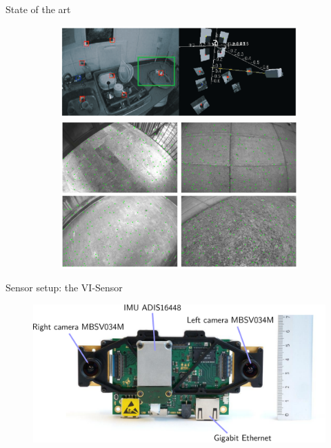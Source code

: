 \documentclass[11pt]{beamer}
\begin{document}
\begin{frame}{State of the art}
\begin{figure}[!htb]
\begin{subfigure}[b]{\textwidth}
\includegraphics[scale=0.1]{figures/introduction/monoslam.pdf}
\includegraphics[scale=0.1]{figures/introduction/svo.pdf}
\end{subfigure}
\end{figure}
\end{frame}


\begin{frame}{Sensor setup: the VI-Sensor
}
\begin{figure}[!htb]
\centering
\includegraphics[width=\textwidth]{figures/introduction/vi_sensor_details.pdf}
\end{figure}
\end{frame}
\end{document}
